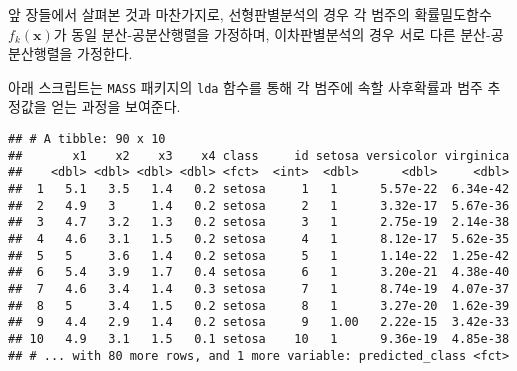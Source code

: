 \documentclass[
]{book}
\newenvironment{Shaded}{\begin{snugshade}}{\end{snugshade}}
\newcommand{\AttributeTok}[1]{\textcolor[rgb]{0.77,0.63,0.00}{#1}}
\newcommand{\FunctionTok}[1]{\textcolor[rgb]{0.00,0.00,0.00}{#1}}
\newcommand{\NormalTok}[1]{#1}
\newcommand{\OtherTok}[1]{\textcolor[rgb]{0.56,0.35,0.01}{#1}}
\newcommand{\SpecialCharTok}[1]{\textcolor[rgb]{0.00,0.00,0.00}{#1}}
\begin{document}
앞 장들에서 살펴본 것과 마찬가지로, 선형판별분석의 경우 각 범주의 확률밀도함수 \(f_k(\mathbf{x})\)가 동일 분산-공분산행렬을 가정하며, 이차판별분석의 경우 서로 다른 분산-공분산행렬을 가정한다.

아래 스크립트는 \texttt{MASS} 패키지의 \texttt{lda} 함수를 통해 각 범주에 속할 사후확률과 범주 추정값을 얻는 과정을 보여준다.

\begin{Shaded}
\end{Shaded}

\begin{verbatim}
## # A tibble: 90 x 10
##       x1    x2    x3    x4 class     id setosa versicolor virginica
##    <dbl> <dbl> <dbl> <dbl> <fct>  <int>  <dbl>      <dbl>     <dbl>
##  1   5.1   3.5   1.4   0.2 setosa     1   1      5.57e-22  6.34e-42
##  2   4.9   3     1.4   0.2 setosa     2   1      3.32e-17  5.67e-36
##  3   4.7   3.2   1.3   0.2 setosa     3   1      2.75e-19  2.14e-38
##  4   4.6   3.1   1.5   0.2 setosa     4   1      8.12e-17  5.62e-35
##  5   5     3.6   1.4   0.2 setosa     5   1      1.14e-22  1.25e-42
##  6   5.4   3.9   1.7   0.4 setosa     6   1      3.20e-21  4.38e-40
##  7   4.6   3.4   1.4   0.3 setosa     7   1      8.74e-19  4.07e-37
##  8   5     3.4   1.5   0.2 setosa     8   1      3.27e-20  1.62e-39
##  9   4.4   2.9   1.4   0.2 setosa     9   1.00   2.22e-15  3.42e-33
## 10   4.9   3.1   1.5   0.1 setosa    10   1      9.36e-19  4.85e-38
## # ... with 80 more rows, and 1 more variable: predicted_class <fct>
\end{verbatim}
\end{document}
